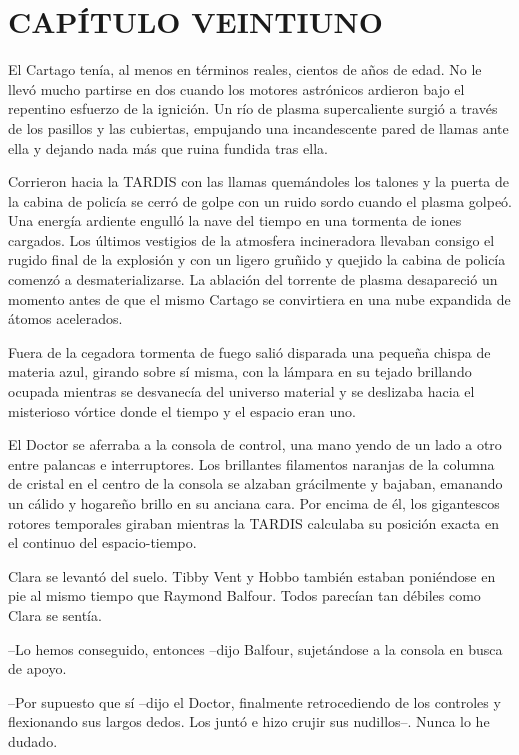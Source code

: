 \chapter*{CAPÍTULO VEINTIUNO}

{El Cartago tenía, al menos en términos reales, cientos de años de edad.
 No le llevó mucho partirse en dos cuando los motores astrónicos ardieron
 bajo el repentino esfuerzo de la ignición. Un río de plasma
 supercaliente surgió a través de los pasillos y las cubiertas, empujando
 una incandescente pared de llamas ante ella y dejando nada más que ruina
fundida tras ella.}

{Corrieron hacia la TARDIS con las llamas quemándoles los talones y la
 puerta de la cabina de policía se cerró de golpe con un ruido sordo
 cuando el plasma golpeó. Una energía ardiente engulló la nave del tiempo
 en una tormenta de iones cargados. Los últimos vestigios de la atmosfera
 incineradora llevaban consigo el rugido final de la explosión y con un
 ligero gruñido y quejido la cabina de policía comenzó a
 desmaterializarse. La ablación del torrente de plasma desapareció un
 momento antes de que el mismo Cartago se convirtiera en una nube
expandida de átomos acelerados.}

{Fuera de la cegadora tormenta de fuego salió disparada una pequeña
 chispa de materia azul, girando sobre sí misma, con la lámpara en su
 tejado brillando ocupada mientras se desvanecía del universo material y
 se deslizaba hacia el misterioso vórtice donde el tiempo y el espacio
 eran uno.}

{El Doctor se aferraba a la consola de
 control, una mano yendo de un lado a otro entre palancas e
 interruptores. Los brillantes filamentos naranjas de la columna de
 cristal en el centro de la consola se alzaban grácilmente y bajaban,
 emanando un cálido y hogareño brillo en su anciana cara. Por encima de
 él, los gigantescos rotores temporales giraban mientras la TARDIS
calculaba su posición exacta en el continuo del espacio-tiempo.}

{Clara se levantó del suelo. Tibby Vent y Hobbo también estaban
 poniéndose en pie al mismo tiempo que Raymond Balfour. Todos parecían
tan débiles como Clara se sentía.}

{--Lo hemos conseguido, entonces --dijo Balfour, sujetándose a la consola
en busca de apoyo.}

{--Por supuesto que sí --dijo el Doctor, finalmente retrocediendo de los
 controles y flexionando sus largos dedos. Los juntó e hizo crujir sus
nudillos--. Nunca lo he dudado.}

